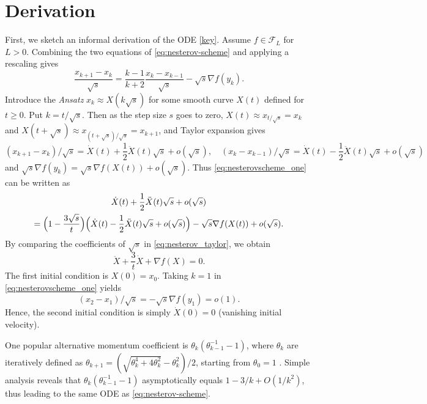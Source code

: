 \documentclass[twoside,11pt]{article}
\newcommand{\der}[1]{\dot #1}
\begin{document}
\section{Derivation}
\label{sec:derivation}
First, we sketch an informal derivation of the ODE \eqref{key}. Assume
$f\in \mathcal{F}_L$ for $L > 0$. Combining the two equations of
\eqref{eq:nesterov-scheme} and applying a rescaling gives
\begin{equation}\label{eq:nesterovscheme_one}
\frac{x_{k+1} -x_k}{\sqrt{s}} =  \frac{k-1}{k+2}\frac{x_k -x_{k-1}}{\sqrt{s}} -  \sqrt{s}\nabla f(y_k).
\end{equation}
Introduce the \textit{Ansatz} $x_k \approx X(k\sqrt{s})$ for some
smooth curve $X(t)$ defined for $t \ge 0$.  Put $k = t/\sqrt{s}$. Then
as the step size $s$ goes to zero, $X(t) \approx x_{t/\sqrt{s}} = x_k$
and $X(t+\sqrt{s} ) \approx x_{(t+\sqrt{s})/\sqrt{s}} = x_{k+1}$, and
Taylor expansion gives
\[
(x_{k+1} -x_k)/ \sqrt{s}  = \dot{X}(t) + \frac{1}{2}\ddot{X}(t)\sqrt{s} + o(\sqrt{s}), \quad (x_{k} -x_{k-1})/ \sqrt{s}  = \dot{X}(t) - \frac{1}{2}\ddot{X}(t)\sqrt{s} + o(\sqrt{s})
\]
and $\sqrt{s}\nabla f(y_k) = \sqrt{s}\nabla f(X(t)) +
o(\sqrt{s})$. Thus \eqref{eq:nesterovscheme_one} can be written as
\begin{multline}\label{eq:nesterov_taylor}
\dot{X}(t) + \frac{1}{2}\ddot{X}(t)\sqrt{s} + o(\sqrt{s})\\
 = \Big{(}1 - \frac{3\sqrt{s}}{t} \Big{)}  \Big{(}\dot{X}(t) - \frac{1}{2}\ddot{X}(t)\sqrt{s} + o(\sqrt{s}) \Big{)} - \sqrt{s}\nabla f(X(t))  + o(\sqrt{s}).
\end{multline}
By comparing the coefficients of $\sqrt{s}$ in \eqref{eq:nesterov_taylor}, we obtain
\begin{equation}\nonumber
\ddot{X} + \frac{3}{t}\dot{X} + \nabla f(X) = 0.
\end{equation}
The first initial condition is $X(0) = x_0$. Taking $k=1$ in \eqref{eq:nesterovscheme_one} yields 
\[
(x_2-x_1)/\sqrt{s} = -\sqrt{s}\nabla f(y_1) = o(1).
\]
Hence, the second initial condition is simply $\der{X(0)} = 0$ (vanishing initial velocity).

One popular alternative momentum coefficient is $\theta_k(\theta_{k-1}^{-1} - 1)$, where $\theta_k$ are iteratively defined as $\theta_{k+1} = \left(\sqrt{\theta_k^4 + 4\theta_k^2} - \theta_k^2 \right)/2$, starting from $\theta_0 = 1$ \citep{nesterov, BeckTeboulle}. Simple analysis reveals that $\theta_k(\theta_{k-1}^{-1} - 1)$ asymptotically equals $1 - 3/k + O(1/k^2)$, thus leading to the same ODE as \eqref{eq:nesterov-scheme}.
\end{document}
